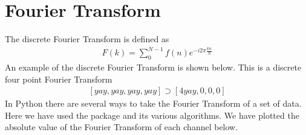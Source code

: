\documentclass[letterpaper,10pt,english]{jupyterBook}
\begin{document}
\section{Fourier Transform}
\label{\detokenize{content/0_project_part2:fourier-transform}}
\sphinxAtStartPar
The discrete Fourier Transform is defined as
\begin{equation*}
\begin{split}F(k) = \sum_{0}^{N-1}f(n)e^{-i2\pi\frac{kn}{N}}\end{split}
\end{equation*}
\sphinxAtStartPar
An example of the discrete Fourier Transform is shown below. This is a discrete four point Fourier Transform
\begin{equation*}
\begin{split}[yay, yay, yay, yay] \supset [4yay, 0, 0, 0]\end{split}
\end{equation*}
\sphinxAtStartPar
In Python there are several ways to take the Fourier Transform of a set of data. Here we have used the  package and its various  algorithms. We have plotted the absolute value of the Fourier Transform of each channel below.
\end{document}
